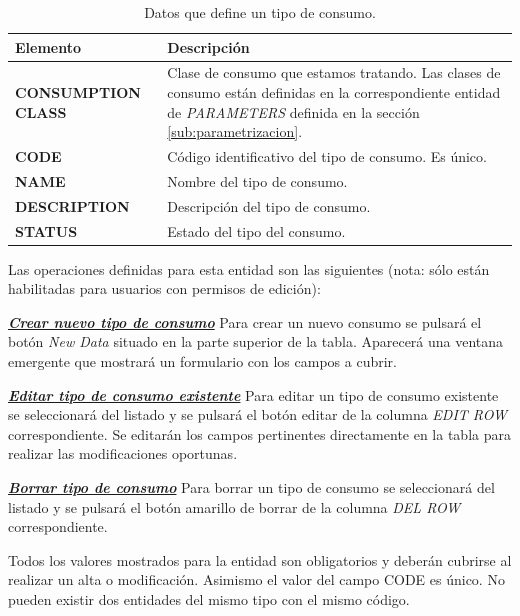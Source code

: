 \begin{table}[H]
  \centering
  \setlength{\leftmargini}{0.4cm}
  \resizebox{14cm}{!} {
  \begin{tabular}{|m{3cm} m{11cm}|}
  \rowcolor{udcpink!25}
  \hline
  	\textbf{Elemento} & \textbf{Descripción} \\\hline
  	\textbf{CONSUMPTION CLASS} & Clase de consumo que estamos tratando. Las clases de consumo están definidas en la correspondiente entidad de \emph{PARAMETERS} definida en la sección \ref{sub:parametrizacion}.   \\
	\textbf{CODE} & Código identificativo del tipo de consumo. Es único.   \\
	\textbf{NAME} & Nombre del tipo de consumo. \\
	\textbf{DESCRIPTION} & Descripción del tipo de consumo. \\		
	\textbf{STATUS} & Estado del tipo del consumo.
	\\\hline
  \end{tabular}
  } %
  \caption{Datos que define un tipo de consumo.}
  \label{tab:tipo-consumo}
\end{table}

Las operaciones definidas para esta entidad son las siguientes (nota: sólo están habilitadas para usuarios con permisos de edición):

\underline{\textsl{\textbf{Crear nuevo tipo de consumo}}}\newline
Para crear un nuevo consumo se pulsará el botón \textit{New Data} situado en la parte superior de la tabla. Aparecerá una ventana emergente que mostrará un formulario con los campos a cubrir.

\underline{\textsl{\textbf{Editar tipo de consumo existente}}}\newline
Para editar un tipo de consumo existente se seleccionará del listado y se pulsará el botón editar de la columna \textit{EDIT ROW} correspondiente. Se editarán los campos pertinentes directamente en la tabla para realizar las modificaciones oportunas. 

\underline{\textsl{\textbf{Borrar tipo de consumo}}}\newline
Para borrar un tipo de consumo se seleccionará del listado y se pulsará el botón amarillo de borrar de la columna \textit{DEL ROW} correspondiente.\newline

Todos los valores mostrados para la entidad son obligatorios y deberán cubrirse al realizar un alta o modificación. Asimismo el valor del campo CODE es único. No pueden existir dos entidades del mismo tipo con el mismo código.





